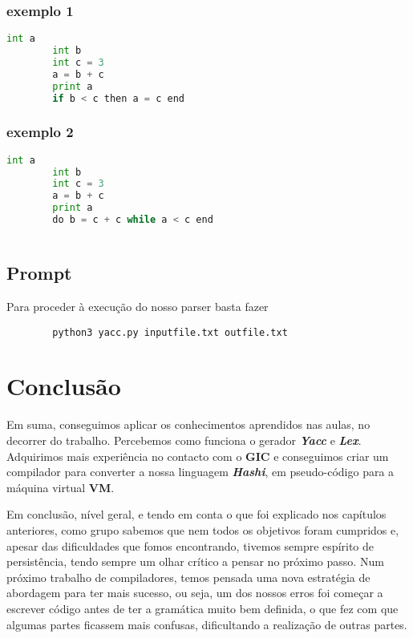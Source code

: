 \documentclass[11pt,a4paper]{report}
\begin{document}
    \subsection{exemplo 1} 
    \begin{lstlisting}[language=python,firstnumber=1]
        int a
        int b
        int c = 3
        a = b + c
        print a
        if b < c then a = c end
    \end{lstlisting}
    \subsection{exemplo 2}
    \begin{lstlisting}[language=python,firstnumber=1]
        int a
        int b
        int c = 3
        a = b + c
        print a
        do b = c + c while a < c end
    
    \end{lstlisting}
\newpage
\section{Prompt}
Para proceder à execução do nosso parser basta fazer

    \begin{lstlisting}
        python3 yacc.py inputfile.txt outfile.txt
    \end{lstlisting}

\pagebreak
    
    
    
	
	\chapter{Conclusão}
	Em suma, conseguimos aplicar os conhecimentos aprendidos nas aulas, no decorrer do trabalho. Percebemos como funciona o gerador \textbf{\textit{Yacc}} e \textbf{\textit{Lex}}. Adquirimos mais experiência no contacto com o \textbf{GIC} e conseguimos criar um compilador para converter a nossa linguagem \textbf{\textit{Hashi}}, em pseudo-código para a máquina virtual \textbf{VM}.
    
    Em conclusão, nível geral, e tendo em conta o que foi explicado nos capítulos anteriores, como grupo sabemos que nem todos os objetivos foram cumpridos e, apesar das dificuldades que fomos encontrando, tivemos sempre espírito de persistência, tendo sempre um olhar crítico a pensar no próximo passo.
    Num próximo trabalho de compiladores, temos pensada uma nova estratégia de abordagem para ter mais sucesso, ou seja, um dos nossos erros foi começar a escrever código antes de ter a gramática muito bem definida, o que fez com que algumas partes ficassem mais confusas, dificultando a realização de outras partes.
    
\end{document}
